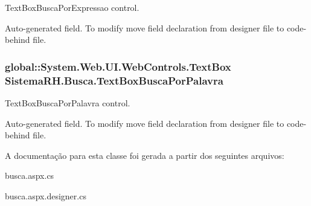TextBoxBuscaPorExpressao control. 

Auto-\/generated field. To modify move field declaration from designer file to code-\/behind file. \hypertarget{class_sistema_r_h_1_1_busca_a9cca7f526f1fa4264ab29f4588746555}{
\subsubsection[{TextBoxBuscaPorPalavra}]{\setlength{\rightskip}{0pt plus 5cm}global::System.Web.UI.WebControls.TextBox {\bf SistemaRH.Busca.TextBoxBuscaPorPalavra}}}
\label{class_sistema_r_h_1_1_busca_a9cca7f526f1fa4264ab29f4588746555}


TextBoxBuscaPorPalavra control. 

Auto-\/generated field. To modify move field declaration from designer file to code-\/behind file. 

A documentação para esta classe foi gerada a partir dos seguintes arquivos:\begin{DoxyCompactItemize}
\item 
busca.aspx.cs\item 
busca.aspx.designer.cs\end{DoxyCompactItemize}
